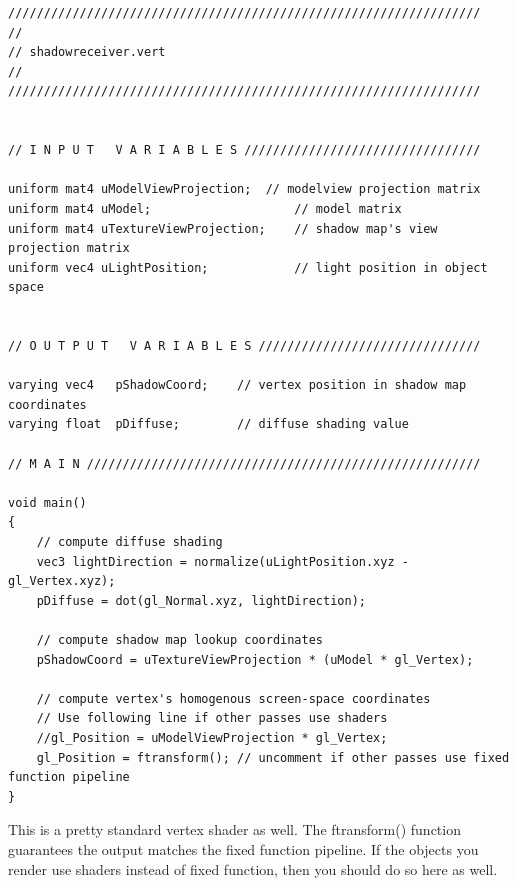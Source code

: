 \documentclass[]{article}  %
\begin{document}
\begin{verbatim}
//////////////////////////////////////////////////////////////////
//
// shadowreceiver.vert
//
//////////////////////////////////////////////////////////////////


// I N P U T   V A R I A B L E S /////////////////////////////////

uniform mat4 uModelViewProjection;	// modelview projection matrix
uniform mat4 uModel;                    // model matrix
uniform mat4 uTextureViewProjection;    // shadow map's view projection matrix
uniform vec4 uLightPosition;            // light position in object space


// O U T P U T   V A R I A B L E S ///////////////////////////////

varying vec4   pShadowCoord;    // vertex position in shadow map coordinates
varying float  pDiffuse;        // diffuse shading value

// M A I N ///////////////////////////////////////////////////////

void main()
{
    // compute diffuse shading
    vec3 lightDirection = normalize(uLightPosition.xyz - gl_Vertex.xyz);
    pDiffuse = dot(gl_Normal.xyz, lightDirection);

    // compute shadow map lookup coordinates
    pShadowCoord = uTextureViewProjection * (uModel * gl_Vertex);

    // compute vertex's homogenous screen-space coordinates
    // Use following line if other passes use shaders
    //gl_Position = uModelViewProjection * gl_Vertex;	
    gl_Position = ftransform();	// uncomment if other passes use fixed function pipeline
}
\end{verbatim}
This is a pretty standard vertex shader as well.  The ftransform() function guarantees the output matches the fixed function pipeline.  If the objects you render use shaders instead of fixed function, then you should do so here as well.
\end{document}
